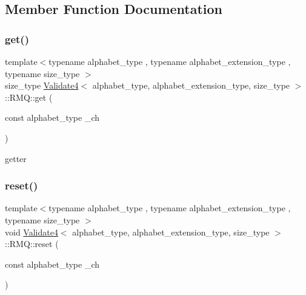 \subsection{Member Function Documentation}
\mbox{\label{struct_validate4_1_1_r_m_q_a25c9ec1cab24c2ea2355b8ce828cf108}} 
\subsubsection{\texorpdfstring{get()}{get()}}
{\footnotesize\ttfamily template$<$typename alphabet\+\_\+type , typename alphabet\+\_\+extension\+\_\+type , typename size\+\_\+type $>$ \\
size\+\_\+type \hyperlink{class_validate4}{Validate4}$<$ alphabet\+\_\+type, alphabet\+\_\+extension\+\_\+type, size\+\_\+type $>$\+::R\+M\+Q\+::get (\begin{DoxyParamCaption}\item[{const alphabet\+\_\+type}]{\+\_\+ch }\end{DoxyParamCaption})\hspace{0.3cm}{\ttfamily [inline]}}



getter 

\mbox{\label{struct_validate4_1_1_r_m_q_a8416e95d49b4b8c05cd814d78017d81f}} 
\subsubsection{\texorpdfstring{reset()}{reset()}}
{\footnotesize\ttfamily template$<$typename alphabet\+\_\+type , typename alphabet\+\_\+extension\+\_\+type , typename size\+\_\+type $>$ \\
void \hyperlink{class_validate4}{Validate4}$<$ alphabet\+\_\+type, alphabet\+\_\+extension\+\_\+type, size\+\_\+type $>$\+::R\+M\+Q\+::reset (\begin{DoxyParamCaption}\item[{const alphabet\+\_\+type}]{\+\_\+ch }\end{DoxyParamCaption})\hspace{0.3cm}{\ttfamily [inline]}}



